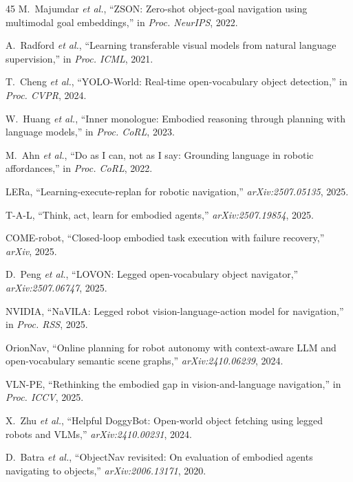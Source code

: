 \documentclass[conference]{IEEEtran}
\begin{document}
\begin{thebibliography}{45}
M.~Majumdar \emph{et al.},
``ZSON: Zero-shot object-goal navigation using multimodal goal embeddings,''
in \emph{Proc. NeurIPS}, 2022.

A.~Radford \emph{et al.},
``Learning transferable visual models from natural language supervision,''
in \emph{Proc. ICML}, 2021.

T.~Cheng \emph{et al.},
``YOLO-World: Real-time open-vocabulary object detection,''
in \emph{Proc. CVPR}, 2024.

W.~Huang \emph{et al.},
``Inner monologue: Embodied reasoning through planning with language models,''
in \emph{Proc. CoRL}, 2023.

M.~Ahn \emph{et al.},
``Do as I can, not as I say: Grounding language in robotic affordances,''
in \emph{Proc. CoRL}, 2022.

LERa,
``Learning-execute-replan for robotic navigation,''
\emph{arXiv:2507.05135}, 2025.

T-A-L,
``Think, act, learn for embodied agents,''
\emph{arXiv:2507.19854}, 2025.

COME-robot,
``Closed-loop embodied task execution with failure recovery,''
\emph{arXiv}, 2025.

D.~Peng \emph{et al.},
``LOVON: Legged open-vocabulary object navigator,''
\emph{arXiv:2507.06747}, 2025.

NVIDIA,
``NaVILA: Legged robot vision-language-action model for navigation,''
in \emph{Proc. RSS}, 2025.

OrionNav,
``Online planning for robot autonomy with context-aware LLM and open-vocabulary semantic scene graphs,''
\emph{arXiv:2410.06239}, 2024.

VLN-PE,
``Rethinking the embodied gap in vision-and-language navigation,''
in \emph{Proc. ICCV}, 2025.

X.~Zhu \emph{et al.},
``Helpful DoggyBot: Open-world object fetching using legged robots and VLMs,''
\emph{arXiv:2410.00231}, 2024.

D.~Batra \emph{et al.},
``ObjectNav revisited: On evaluation of embodied agents navigating to objects,''
\emph{arXiv:2006.13171}, 2020.


\end{thebibliography}
\end{document}
